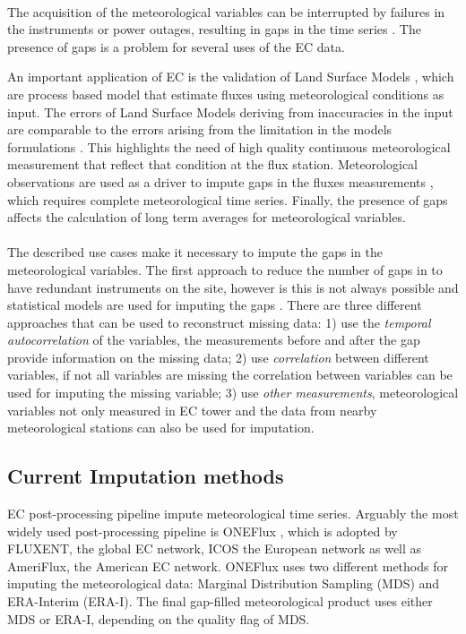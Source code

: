 \documentclass{article}
\let\Oldsubsection\subsection
\renewcommand{\subsection}{\FloatBarrier\Oldsubsection}
\begin{document}
\paragraph{} The acquisition of the meteorological variables can be interrupted by failures in the instruments or power outages, resulting in gaps in the time series \cite{aubinet_eddy_2012-1}.
The presence of gaps is a problem for several uses of the EC data.

An important application of EC is the validation of Land Surface Models \cite{balzarolo_evaluating_2014, friend_fluxnet_2007-1, bonan_improving_2011-1, kramer_evaluation_2002}, which are process based model that estimate fluxes using meteorological conditions as input. The errors of Land Surface Models deriving from inaccuracies in the input are comparable to the errors arising from the limitation in the models formulations \cite{zhao_how_2012}. This highlights the need of high quality continuous meteorological measurement that reflect that condition at the flux station.
Meteorological observations are used as a driver to impute gaps in the fluxes measurements \cite{aubinet_eddy_2012-1}, which requires complete meteorological time series.
Finally, the presence of gaps affects the calculation of long term averages for meteorological variables. 

\paragraph{} The described use cases make it necessary to impute the gaps in the meteorological variables. The first approach to reduce the number of gaps in to have redundant instruments on the site, however is this is not always possible and statistical models are used for imputing the gaps \cite{aubinet_eddy_2012-1}. There are three different approaches that can be used to reconstruct missing data: 1) use the \emph{temporal autocorrelation} of the variables, the measurements  before and after the gap provide information on the missing data; 2) use \emph{correlation} between different variables, if not all variables are missing the correlation between variables can be used for imputing the missing variable; 3) use \emph{other measurements}, meteorological variables not only measured in EC tower and the data from nearby meteorological stations can also be used for imputation.


\subsection{Current Imputation methods} EC post-processing pipeline impute meteorological time series. Arguably the most widely used post-processing pipeline is ONEFlux \cite{pastorello_fluxnet2015_2020}, which is adopted by FLUXENT, the global EC network, ICOS the European network as well as AmeriFlux, the American EC network.
ONEFlux uses two different methods for imputing the meteorological data: Marginal Distribution Sampling (MDS) and ERA-Interim (ERA-I). The final gap-filled meteorological product uses either MDS or ERA-I, depending on the quality flag of MDS.
\end{document}
